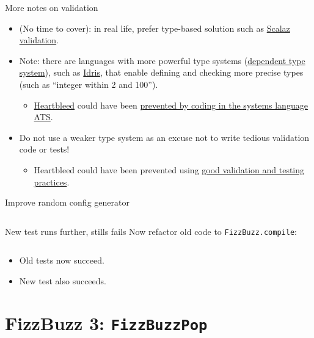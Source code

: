 \begin{frame}[fragile]{More notes on validation}
  \begin{itemize}
  \item (No time to cover): in real life, prefer type-based solution such as \href{http://eed3si9n.com/learning-scalaz/Validation.html}{Scalaz validation}.
  \item Note: there are languages with more powerful type systems (\href{http://en.wikipedia.org/wiki/Dependent_type}{dependent type system}), such as \href{http://www.idris-lang.org/}{Idris}, that enable defining and checking more precise types (such as ``integer within 2 and 100'').
    \begin{itemize}
    \item \href{http://heartbleed.com/}{Heartbleed} could have been \href{http://bluishcoder.co.nz/2014/04/11/preventing-heartbleed-bugs-with-safe-languages.html}{prevented by coding in the systems language ATS}.
    \end{itemize}
  \item Do not use a weaker type system as an \alert{excuse} not to write tedious validation code or tests!
    \begin{itemize}
    \item Heartbleed could have been prevented using \href{http://martinfowler.com/articles/testing-culture.html}{good validation and testing practices}.
    \end{itemize}
  \end{itemize}
\end{frame}

\begin{frame}[fragile]{Improve random config generator}
  \inputminted[gobble=2]{scala}{FizzBuzzSpec7.scala}
\end{frame}

\begin{frame}[fragile]{New test runs further, stills fails}
  Now refactor old code to \texttt{FizzBuzz.compile}:

  \inputminted{scala}{FizzBuzz3Compile.scala}

  \begin{itemize}
  \item Old tests now succeed.
  \item New test also succeeds.
  \end{itemize}
\end{frame}

\section{FizzBuzz 3: \texttt{FizzBuzzPop}}

